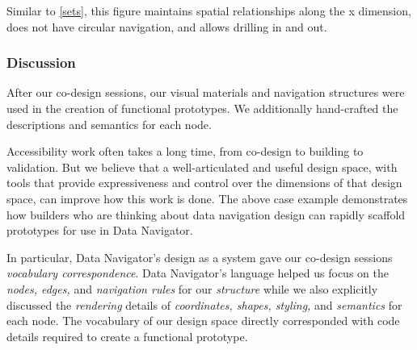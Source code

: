 \documentclass[journal]{vgtc}                %
\begin{document}
Similar to \autoref{sets}, this figure maintains spatial relationships along the x dimension, does not have circular navigation, and allows drilling in and out.


\subsubsection{Discussion}
After our co-design sessions, our visual materials and navigation structures were used in the creation of functional prototypes. We additionally hand-crafted the descriptions and semantics for each node.

Accessibility work often takes a long time, from co-design to building to validation. But we believe that a well-articulated and useful design space, with tools that provide expressiveness and control over the dimensions of that design space, can improve how this work is done. The above case example demonstrates how builders who are thinking about data navigation design can rapidly scaffold prototypes for use in Data Navigator.

In particular, Data Navigator's design as a system gave our co-design sessions \textit{vocabulary correspondence}. Data Navigator's language helped us focus on the \textit{nodes, edges,} and \textit{navigation rules} for our \textit{structure} while we also explicitly discussed the \textit{rendering} details of \textit{coordinates, shapes, styling,} and \textit{semantics} for each node. The vocabulary of our design space directly corresponded with code details required to create a functional prototype.
\end{document}
